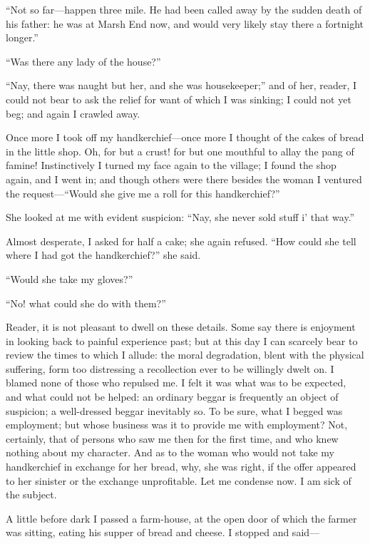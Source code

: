 \enquote{Not so far---happen three mile. He had been called away by the
sudden death of his father: he was at Marsh End now, and would very
likely stay there a fortnight longer.}

\enquote{Was there any lady of the house?}

\enquote{Nay, there was naught but her, and she was housekeeper;} and of
her, reader, I could not bear to ask the relief for want of which I was
sinking; I could not yet beg; and again I crawled away.

Once more I took off my handkerchief---once more I thought of the cakes
of bread in the little shop. Oh, for but a crust! for but one mouthful
to allay the pang of famine! Instinctively I turned my face again to
the village; I found the shop again, and I went in; and though others
were there besides the woman I ventured the request---\enquote{Would she
give me a roll for this handkerchief?}

She looked at me with evident suspicion: \enquote{Nay, she never sold
stuff i' that way.}

Almost desperate, I asked for half a cake; she again refused. 
\enquote{How could she tell where I had got the handkerchief?} she said.

\enquote{Would she take my gloves?}

\enquote{No! what could she do with them?}

Reader, it is not pleasant to dwell on these details. Some say there is
enjoyment in looking back to painful experience past; but at this day I
can scarcely bear to review the times to which I allude: the moral
degradation, blent with the physical suffering, form too distressing a
recollection ever to be willingly dwelt on. I blamed none of those who
repulsed me. I felt it was what was to be expected, and what could not
be helped: an ordinary beggar is frequently an object of suspicion; a
well-dressed beggar inevitably so. To be sure, what I begged was
employment; but whose business was it to provide me with employment? 
Not, certainly, that of persons who saw me then for the first time, and
who knew nothing about my character. And as to the woman who would not
take my handkerchief in exchange for her bread, why, she was right, if
the offer appeared to her sinister or the exchange unprofitable. Let me
condense now. I am sick of the subject.

A little before dark I passed a farm-house, at the open door of which
the farmer was sitting, eating his supper of bread and cheese. I
stopped and said---

